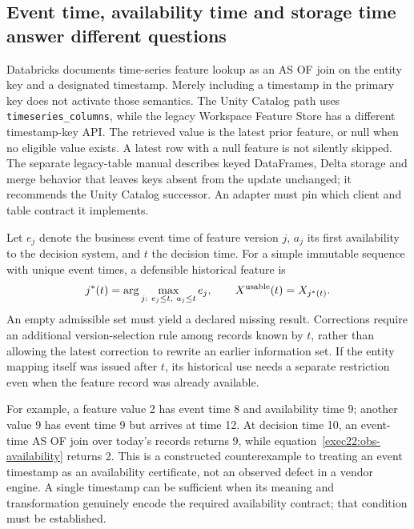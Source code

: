 \subsection{Event time, availability time and storage time answer different questions}
\label{exec22:obs-clocks}

Databricks documents time-series feature lookup as an AS OF join on the entity
key and a designated timestamp. Merely including a timestamp in the primary key
does not activate those semantics. The Unity Catalog path uses
\texttt{timeseries\_columns}, while the legacy Workspace Feature Store has a
different timestamp-key API. The retrieved value is the latest prior feature,
or null when no eligible value exists. A latest row with a null feature is not
silently skipped. The separate legacy-table manual describes keyed DataFrames,
Delta storage and merge behavior that leaves keys absent from the update
unchanged; it recommends the Unity Catalog successor. An adapter must pin which
client and table contract it implements.\cite{exec22_obs_databricks_pit,exec22_obs_databricks_feature}

Let $e_j$ denote the business event time of feature version $j$, $a_j$ its first
availability to the decision system, and $t$ the decision time. For a simple
immutable sequence with unique event times, a defensible historical feature is
\begin{equation}
 j^*(t)=\arg\max_{j:\ e_j\leq t,\ a_j\leq t} e_j,
 \qquad X^{\rm usable}(t)=X_{j^*(t)}.
 \label{exec22:obs-availability}
\end{equation}
An empty admissible set must yield a declared missing result. Corrections require
an additional version-selection rule among records known by $t$, rather than
allowing the latest correction to rewrite an earlier information set. If the
entity mapping itself was issued after $t$, its historical use needs a separate
restriction even when the feature record was already available.

For example, a feature value 2 has event time 8 and availability time 9; another
value 9 has event time 9 but arrives at time 12. At decision time 10, an event-time
AS OF join over today's records returns 9, while
equation~\eqref{exec22:obs-availability} returns 2. This is a constructed
counterexample to treating an event timestamp as an availability certificate,
not an observed defect in a vendor engine. A single timestamp can be sufficient
when its meaning and transformation genuinely encode the required availability
contract; that condition must be established.\cite{exec22_obs_reference}

